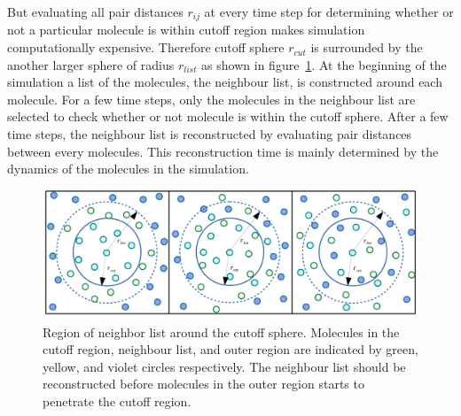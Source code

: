 But evaluating all pair distances $r_{ij}$ at every time step for determining whether or not a particular molecule is within cutoff region makes simulation computationally expensive. Therefore cutoff sphere $r_{cut}$ is surrounded by the another larger sphere of radius $r_{list}$ as shown in figure~\ref{fig:neighbourList}. At the beginning of the simulation a list of the molecules, the neighbour list, is constructed around each molecule. For a few time steps, only the molecules in the neighbour list are selected to check whether or not molecule is within the cutoff sphere. After a few time steps, the neighbour list is reconstructed by evaluating pair distances between every molecules. This reconstruction time is mainly determined by the dynamics of the molecules in the simulation.  
\begin{figure}[tpb]
  \begin{center}
    \centerline{\includegraphics[width = \linewidth]{neighbourList.pdf}}
    \caption{Region of neighbor list around the cutoff sphere. Molecules in the cutoff region, neighbour list, and outer region are indicated by green, yellow, and violet circles respectively. The neighbour list  should be reconstructed before molecules in the outer region starts to penetrate the cutoff region.}
    \label{fig:neighbourList}
  \end{center}
\end{figure}



